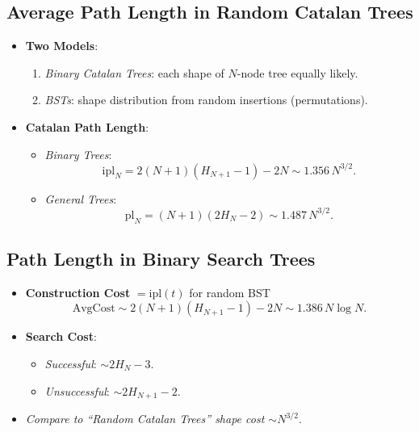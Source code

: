 \documentclass[11pt,letterpaper]{article}
\begin{document}
\subsection{Average Path Length in Random Catalan Trees}
\begin{itemize}
  \item \textbf{Two Models}:
    \begin{enumerate}
      \item \emph{Binary Catalan Trees}: each shape of $N$-node tree equally likely.
      \item \emph{BSTs}: shape distribution from random insertions (permutations).
    \end{enumerate}
  \item \textbf{Catalan Path Length}:
    \begin{itemize}
      \item \emph{Binary Trees}: 
        \[
          \mathrm{ipl}_N = 2(N+1)(H_{N+1}-1)-2N \sim 1.356\,N^{3/2}.
        \]
      \item \emph{General Trees}: 
        \[
          \mathrm{pl}_N = (N+1)(2H_N - 2) \sim 1.487\,N^{3/2}.
        \]
    \end{itemize}
\end{itemize}

\subsection{Path Length in Binary Search Trees}
\begin{itemize}
  \item \textbf{Construction Cost} $= \mathrm{ipl}(t)$ for random BST
    \[
      \mathrm{AvgCost} \sim 2(N+1)(H_{N+1}-1)-2N \sim 1.386\,N\log N.
    \]
  \item \textbf{Search Cost}:
    \begin{itemize}
      \item \emph{Successful}: $\sim 2H_N - 3$.
      \item \emph{Unsuccessful}: $\sim 2H_{N+1}-2$.
    \end{itemize}
  \item \emph{Compare to “Random Catalan Trees” shape cost $\sim N^{3/2}$}. 
\end{itemize}

\end{document}
